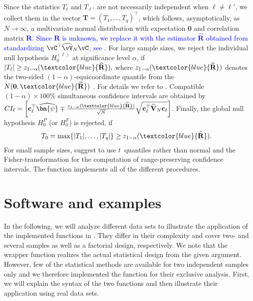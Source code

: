 Since the statistics $T_\ell$ and $T_{\ell'}$ are not necessarily independent 
when $\ell \not = \ell'$, we collect them in the vector $\mathbf{T} = (T_1, 
\ldots, T_q)^\top$, which follows, asymptotically, as $N\to \infty$, a 
multivariate normal distribution with expectation $\mathbf{0}$ and correlation 
matrix \textcolor{blue}{$\mathbf{R}$. Since $\mathbf{R}$ is unknown, we replace it with the estimator $\widehat{\mathbf{R}}$ obtained from standardizing $\vC^\top 
\widehat{\vV}_N \vC$, see \cite{konietschke2012rank}.} For large sample sizes, we reject the individual null 
hypothesis $H_0^{(\ell)}$ at significance level $\alpha$, if 
$
|T_\ell| \geq z_{1-\alpha}(\textcolor{blue}{\widehat{\mathbf{R}}}),
$
where $z_{1-\alpha}(\textcolor{blue}{\widehat{\mathbf{R}}})$ denotes the two-sided $(1 - 
\alpha)$-equicoordinate quantile from the $N(\mathbf{0}, \textcolor{blue}{\widehat{\mathbf{R}}})$ \db. 
For details we refer to \cite{konietschke2012rank, umlauft2019wild}. Compatible 
$(1-\alpha)\times 100\%$ simultaneous confidence intervals are obtained by 
$CI_\ell = \left[ \mathbf{c}_\ell^\top\widehat{\bm{\psi}} \mp 
\frac{z_{1-\alpha}(\textcolor{blue}{\widehat{\mathbf{R}}})}{\sqrt{N}}\sqrt{\mathbf{c}_\ell^\top 
\widehat{\mathbf{V}}_N \mathbf{c}_\ell} \right]$. Finally, the global null 
hypothesis $H_0^P$ (or $H_0^F$) is rejected, if 
\begin{eqnarray}
T_0= \max\{|T_1|,\ldots, |T_q|\} \geq z_{1-\alpha}(\textcolor{blue}{\widehat{\mathbf{R}}}). \label{t0max}
\end{eqnarray}
For small sample sizes, \cite{konietschke2012rank} suggest to use $t$~quantiles 
rather than normal and the Fisher-transformation for the computation of 
range-preserving confidence intervals. The  function implements 
all of the different procedures.


\section{Software and examples} \label{sec: examples}

In the following, we will analyze different data sets to illustrate the 
application of the implemented functions in . They differ in their 
complexity and cover two- and several samples as well as a factorial design, 
respectively. We note that the wrapper function  realizes the 
actual statistical design from the given  argument. However, few 
of the statistical methods are available for two independent samples only and 
we therefore implemented the function  for their 
exclusive analysis. First, we will explain the syntax of the two functions and 
then illustrate their application using real data sets.

